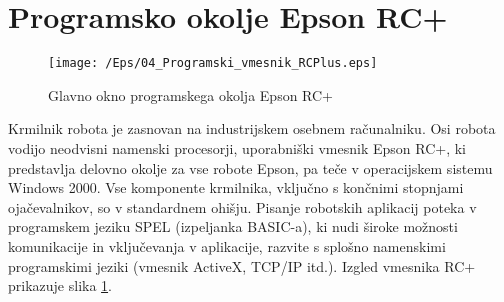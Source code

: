 \section{Programsko okolje Epson RC+}

\begin{figure}[b]
    \centering
    \texttt{[image: /Eps/04\_Programski\_vmesnik\_RCPlus.eps]}
    \vspace{-0.3cm}
    \caption{Glavno okno programskega okolja Epson RC+}
    \label{fProgramskoOkolje}
\end{figure}

Krmilnik robota je zasnovan na industrijskem osebnem računalniku.
Osi robota vodijo neodvisni namenski procesorji, uporabniški
vmesnik Epson RC+, ki predstavlja delovno okolje za vse robote
Epson, pa teče v operacijskem sistemu Windows 2000. Vse komponente
krmilnika, vključno s končnimi stopnjami ojačevalnikov, so v
standardnem ohišju. Pisanje robotskih aplikacij poteka v
programskem jeziku SPEL (izpeljanka BASIC-a), ki nudi široke
možnosti komunikacije in vključevanja v aplikacije, razvite s
splošno namenskimi programskimi jeziki (vmesnik ActiveX, TCP/IP
itd.). Izgled vmesnika RC+ prikazuje slika
\ref{fProgramskoOkolje}.





\vspace{0.2cm}
